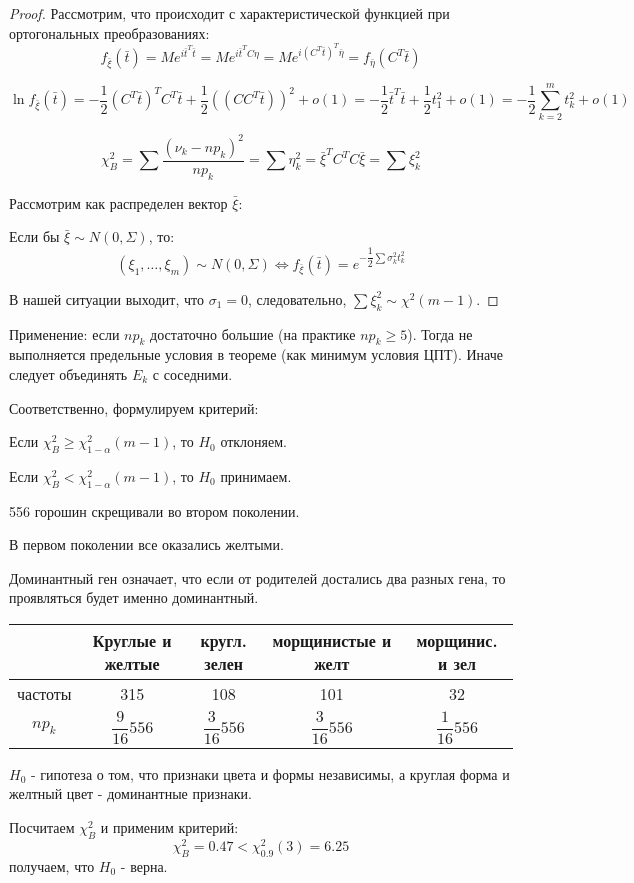 \begin{proof}
  Рассмотрим, что происходит с характеристической функцией при ортогональных преобразованиях:
  \[
    f_{\bar \xi} (\bar t) = M e^{i \bar t^T \bar t} = M e^{i \bar t^T C \eta} =
    M e^{i (C^T \bar t)^T \bar \eta} = f_{\bar \eta} (C^T \bar t)
  \]

  \[
    \ln f_{\bar \xi} (\bar t) = - \dfrac{1}{2} (C^T \bar t)^T C^T \bar t + \dfrac{1}{2} ((C C^T \bar t))^2 + o(1) = -\dfrac{1}{2} \bar t^T \bar t + \dfrac{1}{2} t_1^2 + o(1) = - \dfrac{1}{2} \sum_{k=2}^m t_k^2 + o(1)
  \]

  \[
    \chi^2_B = \sum \dfrac{(\nu_k - np_k)^2}{np_k} = \sum \eta_k^2 = \bar \xi^T C^T C \bar \xi = \sum \xi_k^2
  \]

  Рассмотрим как распределен вектор $\bar \xi$:
  
  Если бы $\bar \xi \sim N(0, \Sigma)$, то:
  \[
    (\xi_1, \dots, \xi_m) \sim N(0, \Sigma) \Leftrightarrow f_{\bar \xi} (\bar t) = e^{-\dfrac{1}{2} \sum \sigma_k^2 t_k^2}
  \]

  В нашей ситуации выходит, что $\sigma_1 = 0$, следовательно, $\sum \xi_k^2 \sim \chi^2 (m-1)$.
\end{proof}

Применение: если $np_k$ достаточно большие (на практике $np_k \geqslant 5$). Тогда не выполняется предельные условия в теореме (как минимум условия ЦПТ). Иначе следует объединять $E_k$ с соседними.

Соответственно, формулируем критерий:

Если $\chi^2_B \geqslant \chi^2_{1-\alpha} (m-1)$, то $H_0$ отклоняем.

Если $\chi^2_B < \chi^2_{1-\alpha}(m-1)$, то $H_0$ принимаем.

\begin{ex}[Мендель]
  556 горошин скрещивали во втором поколении.

  В первом поколении все оказались желтыми.

  Доминантный ген означает, что если от родителей достались два разных гена,
  то проявляться будет именно доминантный.
  
  \begin{center}
    \begin{tabular}{|c|c|c|c|c|}
      \hline
       & Круглые и желтые & кругл. зелен & морщинистые и желт & морщинис. и зел \\
      \hline
      частоты & 315 & 108 & 101 & 32 \\
      \hline
      $np_k$ & $\dfrac{9}{16} 556$ & $\dfrac{3}{16} 556$ & $\dfrac{3}{16} 556$ & $\dfrac{1}{16} 556$ \\
      \hline
    \end{tabular}
  \end{center}

  $H_0$ - гипотеза о том, что признаки цвета и формы независимы,
  а круглая форма и желтный цвет - доминантные признаки.

  Посчитаем $\chi^2_B$ и применим критерий:
  \[
    \chi^2_B = 0.47 < \chi^2_{0.9} (3) = 6.25
  \]
  получаем, что $H_0$ - верна.
\end{ex}
